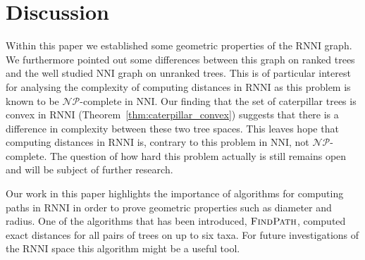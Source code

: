 \documentclass{amsart}
\newcommand{\np}{\mathcal{NP}}
\newcommand{\nni}{\mathrm{NNI}}
\newcommand{\rnni}{\mathrm{RNNI}}
\newcommand{\findpath}{\textsc{FindPath}}
\newtheorem{theorem}[definition]{Theorem}
\begin{document}
%
%
%
%
%

\section{Discussion}

Within this paper we established some geometric properties of the $\rnni$ graph.
We furthermore pointed out some differences between this graph on ranked trees and the well studied $\nni$ graph on unranked trees.
This is of particular interest for analysing the complexity of computing distances in $\rnni$ as this problem is known to be $\np$-complete in $\nni$.
Our finding that the set of caterpillar trees is convex in $\rnni$ (Theorem~\ref{thm:caterpillar_convex}) suggests that there is a difference in complexity between these two tree spaces.
This leaves hope that computing distances in $\rnni$ is, contrary to this problem in $\nni$, not $\np$-complete.
The question of how hard this problem actually is still remains open and will be subject of further research.

Our work in this paper highlights the importance of algorithms for computing paths in $\rnni$ in order to prove geometric properties such as diameter and radius.
One of the algorithms that has been introduced, $\findpath$, computed exact distances for all pairs of trees on up to six taxa.
For future investigations of the $\rnni$ space this algorithm might be a useful tool.

\printbibliography
\end{document}
